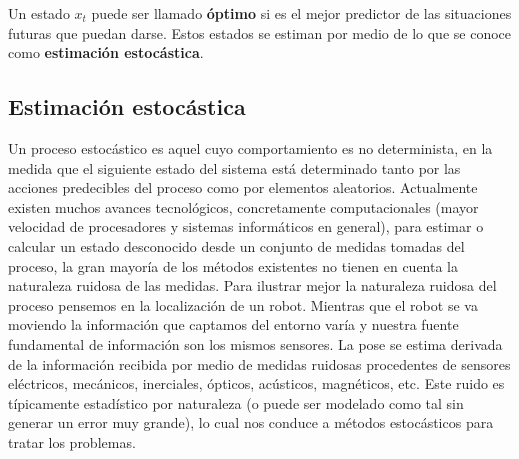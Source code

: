 Un estado $x_{t}$ puede ser llamado \textbf{óptimo} si es el mejor predictor de las situaciones futuras que puedan darse.
%
%
%
Estos estados se estiman por medio de lo que se conoce como \textbf{estimación estocástica}.

\subsection{Estimación estocástica} \label{sec:Estimacion_estocastica}
Un proceso estocástico es aquel cuyo comportamiento es no determinista, en la medida que el siguiente estado del sistema está determinado tanto por las acciones predecibles del proceso como por elementos aleatorios.
Actualmente existen muchos avances tecnológicos, concretamente computacionales (mayor velocidad de procesadores y sistemas informáticos en general), para estimar o calcular un estado desconocido desde un conjunto de medidas tomadas del proceso, la gran mayoría de los métodos existentes no tienen en cuenta la naturaleza ruidosa de las medidas.
%
%
%
%
%
Para ilustrar mejor la naturaleza ruidosa del proceso pensemos en la localización de un robot. Mientras que el robot se va moviendo la información que captamos del entorno varía y nuestra fuente fundamental de información son los mismos sensores. 
La pose se estima derivada de la información recibida por medio de medidas ruidosas procedentes de sensores eléctricos, mecánicos, inerciales, ópticos, acústicos, magnéticos, etc. 
Este ruido es típicamente estadístico por naturaleza (o puede ser modelado como tal sin generar un error muy grande), lo cual nos conduce a métodos estocásticos para tratar los problemas.

